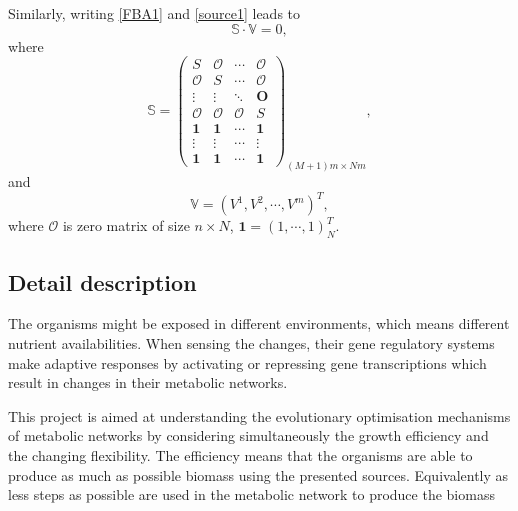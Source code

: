 \documentclass[paper=a4, fontsize=12pt]{scrartcl}	%
\numberwithin{equation}{section}					%
\numberwithin{figure}{section}					%
\numberwithin{table}{section}					%
\begin{document}
Similarly, writing \eqref{FBA1} and \eqref{source1} leads to 
\begin{equation}
\mathbb S\cdot \mathbb V=0,
\end{equation}
where 
\begin{equation}
\nonumber \mathbb S =\left(\begin{array}{cccc}  S & \mathcal O & \cdots & \mathcal O \\
							\mathcal O & S & \cdots & \mathcal O \\
							\vdots & \vdots & \ddots & \mathbf O \\
							\mathcal O & \mathcal O & \mathcal O & S \\ 
							\mathbf 1 &  \mathbf 1 & \cdots & \mathbf 1 \\ 
							\vdots & \vdots & \cdots & \vdots \\ 
							\mathbf 1 & \mathbf 1 & \cdots & \mathbf 1\end{array}\right)_{(M+1)m\times Nm},
\end{equation}
and 
\begin{equation}
\nonumber \mathbb V=(V^1, V^2, \cdots, V^m)^T,
\end{equation}
where $\mathcal O$ is zero matrix of size $n\times N$,  $\mathbf 1 =(1, \cdots, 1)_{N}^T$. 


\subsection{Detail description}
The organisms might be exposed in different environments, which means different nutrient availabilities. When sensing the changes, their gene regulatory systems make adaptive responses by activating or repressing gene transcriptions which result in changes in their metabolic networks. 

This project is aimed at understanding the evolutionary optimisation mechanisms of metabolic networks by considering simultaneously the growth efficiency and the changing flexibility. The efficiency means that the organisms are able to produce as much as possible biomass using the presented sources. Equivalently as less steps as possible are used in the metabolic network to produce the biomass
\end{document}

